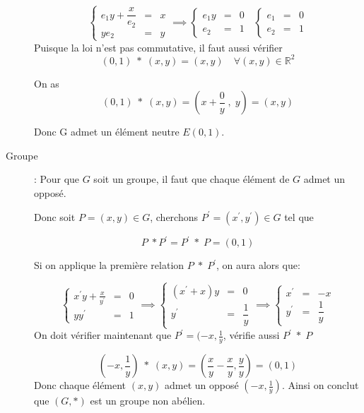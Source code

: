 \documentclass[12pt,a4paper,dvipsnames]{article}
\begin{document}
\begin{description}
        \begin{equation}
            \left\{
            \begin{array}{ccc}
                e_1y + \dfrac{x}{e_2} &=& x\\[4pt]
                y e_2 &=& y
        \end{array}\right.
        \implies 
            \left\{
            \begin{array}{ccc}
                e_1y&=& 0\\[4pt]
                e_2 &=& 1
        \end{array}\right.
\;\;
            \left\{
            \begin{array}{ccc}
                e_1&=& 0\\[4pt]
                e_2 &=& 1
        \end{array}\right.
        \end{equation}
        Puisque la loi n'est pas commutative, il faut aussi vérifier 
        $$
        (0,1)\;*\; (x,y) = (x,y) \quad\forall (x,y)\in\mathbb{R}^2
        $$

        On as 
        $$(0,1)\;*\; (x,y) = (x + \frac{0}{y}\;,\; y) = (x,y)
        $$

        Donc G admet un élément neutre $E(0,1)$.

    \item[Groupe]: Pour que $G$ soit un groupe, il faut que chaque élément de
        $G$ admet un opposé.

        Donc soit $P=(x,y)\in G$, cherchons $P^{'}=(x^{'}, y^{'})\in G$ tel que

        \begin{equation}
            P\;*P^{'} = P^{'}\;*\; P = (0,1)
        \end{equation}

        Si on applique la première relation $P\;*\; P^{'}$, on aura alors que:

$$
            \left\{
            \begin{array}{ccc}
                x^{'}y + \frac{x}{y^{'}}&=& 0\\[4pt]
                yy^{'}&=& 1
        \end{array}\right.
        \implies
            \left\{
            \begin{array}{ccc}
                (x^{'} + x)y&=& 0\\[4pt]
                y^{'}&=& \dfrac{1}{y}
        \end{array}\right.
        \implies
            \left\{
            \begin{array}{ccc}
                x^{'}  &=& -x\\[4pt]
                y^{'}&=& \dfrac{1}{y}
        \end{array}\right.
$$
On doit vérifier maintenant que $P^{'}=(-x,\frac{1}{y}$, vérifie aussi
$P^{'}\;*\;P$

\begin{equation}
    (-x,\frac{1}{y}) \;*\; (x,y) = (\frac{x}{y} - \frac{x}{y}, \frac{y}{y}) =
    (0,1) 
\end{equation}
Donc chaque élément $(x,y)$ admet un opposé $(-x, \frac{1}{y})$. Ainsi on conclut
que $(G, *)$ est un groupe non abélien.
\end{description}
\end{document}
